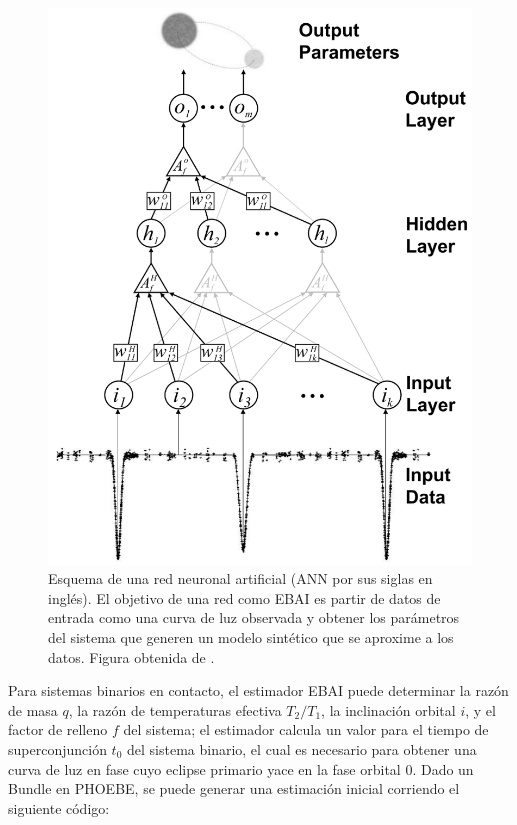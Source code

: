\begin{figure}[!ht]
	\centering
	\includegraphics[scale=0.5]{Introduccion/Figures/Figura PHOEBE EBAI ANN Diagrama.png}
	\caption{Esquema de una red neuronal artificial (ANN por sus siglas en
	inglés). El objetivo de una red como EBAI es partir de datos de entrada como
	una curva de luz observada y obtener los parámetros del sistema que generen
	un modelo sintético que se aproxime a los datos. Figura obtenida de
	.}
	\label{figuraPhoebeEbaiAnnDiagrama}
\end{figure}

Para sistemas binarios en contacto, el estimador EBAI puede determinar la razón
de masa $q$, la razón de temperaturas efectiva $T_2/T_1$, la inclinación orbital
$i$, y el factor de relleno $f$ del sistema; el estimador calcula un valor para
el tiempo de superconjunción $t_0$ del sistema binario, el cual es necesario
para obtener una curva de luz en fase cuyo eclipse primario yace en la fase
orbital 0. Dado un Bundle en PHOEBE, se puede generar una estimación inicial
corriendo el siguiente código:


